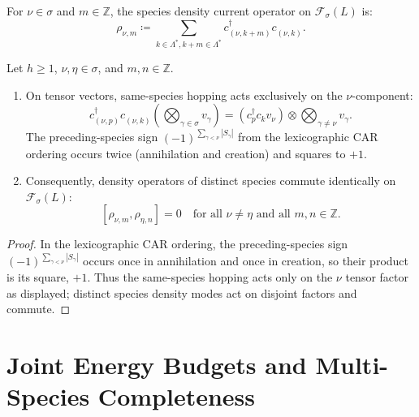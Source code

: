 \begin{definition}
\label{def:multispecies_density}
For $\nu \in \sigma$ and $m \in \mathbb{Z}$, the species density current operator on $\mathcal{F}_\sigma(L)$ is:
\begin{equation}
\rho_{\nu, m} \coloneqq \sum_{k \in \Lambda^*, k+m \in \Lambda^*} c_{(\nu, k+m)}^\dagger c_{(\nu, k)}^{\phantom{\dagger}}.
\end{equation}
\end{definition}

\begin{lemma}
\label{lem:species_density_comm}
Let $h \ge 1$, $\nu, \eta \in \sigma$, and $m, n \in \mathbb{Z}$.
\begin{enumerate}
    \item On tensor vectors, same-species hopping acts exclusively on the $\nu$-component:
    \begin{equation}
    c_{(\nu, p)}^\dagger c_{(\nu, k)}^{\phantom{\dagger}} \left( \bigotimes_{\gamma \in \sigma} v_\gamma \right) = \left( c_p^\dagger c_k v_\nu \right) \otimes \bigotimes_{\gamma \neq \nu} v_\gamma.
    \end{equation}
    The preceding-species sign $(-1)^{\sum_{\gamma < \nu} |S_\gamma|}$ from the lexicographic CAR ordering occurs twice (annihilation and creation) and squares to $+1$.
    \item Consequently, density operators of distinct species commute identically on $\mathcal{F}_\sigma(L)$:
    \begin{equation}
    \label{eq:cross_species_comm}
    [\rho_{\nu, m}, \rho_{\eta, n}] = 0 \quad \text{for all } \nu \neq \eta \text{ and all } m, n \in \mathbb{Z}.
    \end{equation}
\end{enumerate}
\end{lemma}

\begin{proof}
In the lexicographic CAR ordering, the preceding-species sign $(-1)^{\sum_{\gamma<\nu}|S_\gamma|}$ occurs once in annihilation and once in creation, so their product is its square, $+1$. Thus the same-species hopping acts only on the $\nu$ tensor factor as displayed; distinct species density modes act on disjoint factors and commute.
\end{proof}

\section{Joint Energy Budgets and Multi-Species Completeness}

